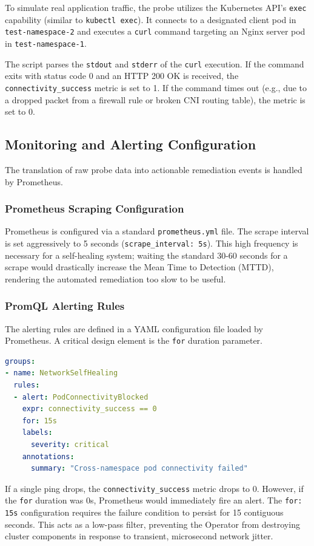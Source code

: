 \documentclass[12pt,a4paper]{article}
\begin{document}
To simulate real application traffic, the probe utilizes the Kubernetes API's \texttt{exec} capability (similar to \texttt{kubectl exec}). It connects to a designated client pod in \texttt{test-namespace-2} and executes a \texttt{curl} command targeting an Nginx server pod in \texttt{test-namespace-1}. 

The script parses the \texttt{stdout} and \texttt{stderr} of the \texttt{curl} execution. If the command exits with status code 0 and an HTTP 200 OK is received, the \texttt{connectivity\_success} metric is set to 1. If the command times out (e.g., due to a dropped packet from a firewall rule or broken CNI routing table), the metric is set to 0.

\subsection{Monitoring and Alerting Configuration}
The translation of raw probe data into actionable remediation events is handled by Prometheus.

\subsubsection{Prometheus Scraping Configuration}
Prometheus is configured via a standard \texttt{prometheus.yml} file. The scrape interval is set aggressively to 5 seconds (\texttt{scrape\_interval: 5s}). This high frequency is necessary for a self-healing system; waiting the standard 30-60 seconds for a scrape would drastically increase the Mean Time to Detection (MTTD), rendering the automated remediation too slow to be useful.

\subsubsection{PromQL Alerting Rules}
The alerting rules are defined in a YAML configuration file loaded by Prometheus. A critical design element is the \texttt{for} duration parameter.

\begin{lstlisting}[language=YAML, caption=Prometheus Rule for Pod Connectivity Failure]
groups:
- name: NetworkSelfHealing
  rules:
  - alert: PodConnectivityBlocked
    expr: connectivity_success == 0
    for: 15s
    labels:
      severity: critical
    annotations:
      summary: "Cross-namespace pod connectivity failed"
\end{lstlisting}

If a single ping drops, the \texttt{connectivity\_success} metric drops to 0. However, if the \texttt{for} duration was 0s, Prometheus would immediately fire an alert. The \texttt{for: 15s} configuration requires the failure condition to persist for 15 contiguous seconds. This acts as a low-pass filter, preventing the Operator from destroying cluster components in response to transient, microsecond network jitter.
\end{document}

